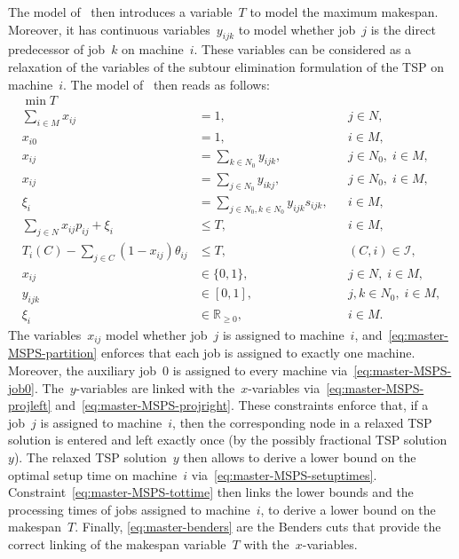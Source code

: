 \documentclass[a4paper,10pt]{article}
\newcommand{\R}{\mathds{R}}
\theoremstyle{definition}
\begin{document}
The model of~\cite{tran2016decomposition} then introduces a variable~$T$ to model the maximum makespan.
Moreover, it has continuous variables~$y_{ijk}$ to model whether job~$j$ is the direct predecessor of job~$k$ on machine~$i$.
These variables can be considered as a relaxation of the variables of the subtour elimination formulation of the TSP on machine~$i$.
The model of~\cite{tran2016decomposition} then reads as follows:
%
\begin{subequations}
  \begin{align}
    \min T & \nonumber \\
    \sum_{i \in M} x_{ij} &= 1, && j \in N, \label{eq:master-MSPS-partition}\\
    x_{i0} &= 1, && i \in M, \label{eq:master-MSPS-job0}\\
    x_{ij} &= \sum_{k \in N_0} y_{ijk}, && j \in N_0,\; i \in M, \label{eq:master-MSPS-projleft}\\
    x_{ij} &= \sum_{j \in N_0} y_{ikj}, && j \in N_0,\; i \in M, \label{eq:master-MSPS-projright}\\
    \xi_i &= \sum_{j \in N_0, k \in N_0} y_{ijk} s_{ijk}, && i \in M, \label{eq:master-MSPS-setuptimes}\\
    \sum_{j \in N} x_{ij} p_{ij} + \xi_i &\leq T, && i \in M, \label{eq:master-MSPS-tottime}\\
    T_i(C) - \sum_{j\in C} (1-x_{ij})\theta_{ij} &\leq T, && (C, i)\in \mathcal{I}, \label{eq:master-benders}\\
    x_{ij}  &\in \{0,1\},     && j \in N,\; i \in M, \\
    y_{ijk} &\in [0,1],     && j, k \in N_0,\; i \in M,\\
    \xi_i   &\in \R_{\geq 0}, && i \in M.
  \end{align}
\end{subequations}
% 
The variables~$x_{ij}$ model whether job~$j$ is assigned to machine~$i$, and~\eqref{eq:master-MSPS-partition} enforces that each job is assigned to exactly one machine.
Moreover, the auxiliary job~$0$ is assigned to every machine via~\eqref{eq:master-MSPS-job0}.
The~$y$-variables are linked with the~$x$-variables via~\eqref{eq:master-MSPS-projleft} and~\eqref{eq:master-MSPS-projright}.
These constraints enforce that, if a job~$j$ is assigned to machine~$i$, then the corresponding node in a relaxed TSP solution is entered and left exactly once (by the possibly fractional TSP solution~$y$).
The relaxed TSP solution~$y$ then allows to derive a lower bound on the optimal setup time on machine~$i$ via~\eqref{eq:master-MSPS-setuptimes}.
Constraint~\eqref{eq:master-MSPS-tottime} then links the lower bounds and the processing times of jobs assigned to machine~$i$, to derive a lower bound on the makespan~$T$.
Finally, \eqref{eq:master-benders} are the Benders cuts that provide the correct linking of the makespan variable~$T$ with the~$x$-variables.
\end{document}
